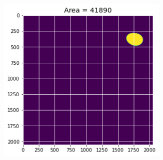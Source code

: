 \documentclass[12pt, a4paper]{report}
\begin{document}
\begin{figure}[H]
\begin{subfigure}{.24\textwidth}
  \label{img:microstrImg}
\end{subfigure}
\begin{subfigure}{.24\textwidth}
  \centering
  \includegraphics[width=0.9\textwidth]{Pictures/Growth/4.5.jpeg}
  \label{img:microstrImg}
\end{subfigure}
\label{fig:test}
\end{figure}
\end{document}
